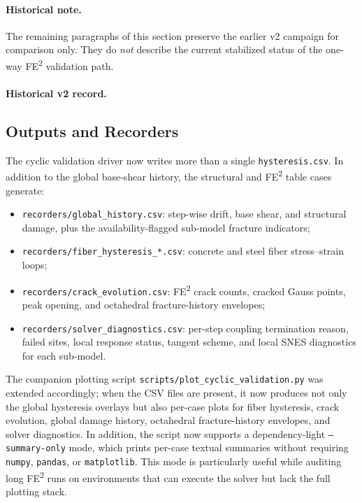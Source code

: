 \paragraph{Historical note.}
The remaining paragraphs of this section preserve the earlier v2 campaign for
comparison only.  They do \emph{not} describe the current stabilized status of
the one-way FE\textsuperscript{2} validation path.

\paragraph{Historical v2 record.}

\subsection{Outputs and Recorders}

The cyclic validation driver now writes more than a single
\texttt{hysteresis.csv}.  In addition to the global base-shear history, the
structural and FE\textsuperscript{2} table cases generate:
\begin{itemize}
  \item \texttt{recorders/global\_history.csv}: step-wise drift, base shear, and
    structural damage, plus the availability-flagged sub-model fracture
    indicators;
  \item \texttt{recorders/fiber\_hysteresis\_*.csv}: concrete and steel fiber
    stress--strain loops;
  \item \texttt{recorders/crack\_evolution.csv}: FE\textsuperscript{2} crack
    counts, cracked Gauss points, peak opening, and octahedral
    fracture-history envelopes;
  \item \texttt{recorders/solver\_diagnostics.csv}: per-step coupling
    termination reason, failed sites, local response status, tangent scheme,
    and local SNES diagnostics for each sub-model.
\end{itemize}

The companion plotting script
\texttt{scripts/plot\_cyclic\_validation.py} was extended accordingly; when the
CSV files are present, it now produces not only the global hysteresis overlays
but also per-case plots for fiber hysteresis, crack evolution, global damage
history, octahedral fracture-history envelopes, and solver diagnostics.
In addition, the script now supports a dependency-light
\texttt{--summary-only} mode, which prints per-case textual summaries without
requiring \texttt{numpy}, \texttt{pandas}, or \texttt{matplotlib}.  This mode
is particularly useful while auditing long FE\textsuperscript{2} runs on
environments that can execute the solver but lack the full plotting stack.



